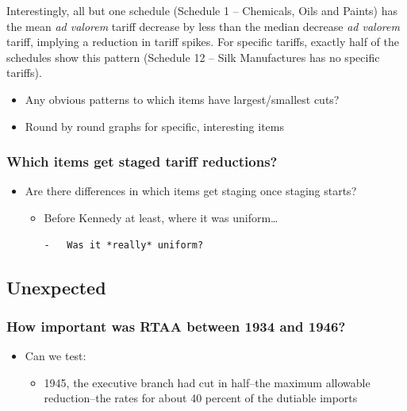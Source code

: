 \documentclass[
  12pt,
]{article}
\providecommand{\tightlist}{%
  \setlength{\itemsep}{0pt}\setlength{\parskip}{0pt}}
\begin{document}
Interestingly, all but one schedule (Schedule 1 -- Chemicals, Oils and Paints) has the mean \emph{ad valorem} tariff decrease by less than the median decrease \emph{ad valorem} tariff, implying a reduction in tariff spikes. For specific tariffs, exactly half of the schedules show this pattern (Schedule 12 -- Silk Manufactures has no specific tariffs).

\begin{itemize}
\item
  Any obvious patterns to which items have largest/smallest cuts?
\item
  Round by round graphs for specific, interesting items
\end{itemize}

\hypertarget{which-items-get-staged-tariff-reductions}{%
\subsubsection{Which items get staged tariff reductions?}\label{which-items-get-staged-tariff-reductions}}

\begin{itemize}
\item
  Are there differences in which items get staging once staging starts?

  \begin{itemize}
  \item
    Before Kennedy at least, where it was uniform\ldots{}

\begin{verbatim}
-   Was it *really* uniform?
\end{verbatim}
  \end{itemize}
\end{itemize}

\hypertarget{unexpected}{%
\subsection{Unexpected}\label{unexpected}}

\hypertarget{how-important-was-rtaa-between-1934-and-1946}{%
\subsubsection{How important was RTAA between 1934 and 1946?}\label{how-important-was-rtaa-between-1934-and-1946}}

\begin{itemize}
\item
  Can we test:

  \begin{itemize}
  \tightlist
  \item
    1945, the executive branch had cut in half--the maximum allowable reduction--the rates for about 40 percent of the dutiable imports
  \end{itemize}
\end{itemize}
\end{document}
